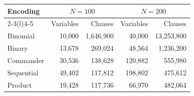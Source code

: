 \begin{tabular}{@{}lrrrr@{}}
\toprule
\multirow{2}{*}{Encoding} & \multicolumn{2}{c}{$N=100$} & \multicolumn{2}{c}{$N=200$} \\
\cmidrule(l){2-3}\cmidrule(l){4-5}
 & Variables & Clauses & Variables & Clauses \\ \midrule
Binomial & 10,000 & 1,646,900 & 40,000 & 13,253,800 \\
Binary & 13,678 & 269,024 & 48,564 & 1,236,200 \\
Commander & 30,536 & 138,628 & 120,882 & 555,980 \\
Sequential & 49,402 & 117,812 & 198,802 & 475,612 \\
Product & 19,428 & 117,736 & 66,970 & 482,064 \\
\bottomrule
\end{tabular}
